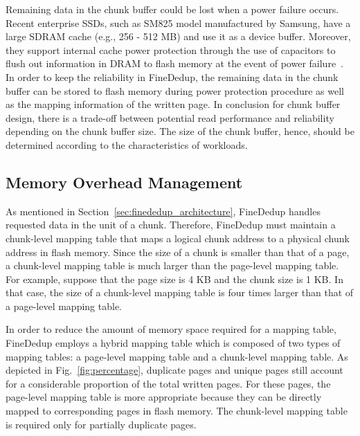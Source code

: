 Remaining data in the chunk buffer could be lost when a power failure occurs.
Recent enterprise SSDs, such as SM825 model manufactured by Samsung, have a large SDRAM cache (e.g., 256 - 512 MB) and use it as a device buffer.
Moreover, they support internal cache power protection through the use of capacitors to flush out information in DRAM to flash memory 
at the event of power failure~\cite{sm825}.
In order to keep the reliability in FineDedup, the remaining data in the chunk buffer can be stored to flash memory 
during power protection procedure as well as the mapping information of the written page.
In conclusion for chunk buffer design, there is a trade-off between potential read performance 
and reliability depending on the chunk buffer size.
The size of the chunk buffer, hence, should be determined according to the characteristics of workloads.

\subsection{Memory Overhead Management}
\label{sec:finededup_memoryoverheadmanagement}

As mentioned in Section~\ref{sec:finededup_architecture},
FineDedup handles requested data in the unit of a chunk.
Therefore, FineDedup must maintain a chunk-level mapping table
that maps a logical chunk address to a physical chunk address in flash memory.
Since the size of a chunk is smaller than that of a page,
a chunk-level mapping table is much larger than the page-level mapping table.
For example, suppose that the page size is 4 KB and the chunk size is 1 KB.
In that case, the size of a chunk-level mapping table is four times larger than that of a page-level mapping table.

In order to reduce the amount of memory space required for a mapping table,
FineDedup employs a hybrid mapping table
which is composed of two types of mapping tables:
a page-level mapping table and a chunk-level mapping table.
As depicted in Fig.~\ref{fig:percentage}, 
duplicate pages and unique pages still account for a considerable proportion of the total written pages.
For these pages, the page-level mapping table is more appropriate 
because they can be directly mapped to corresponding pages in flash memory.
The chunk-level mapping table is required only for partially duplicate pages.

